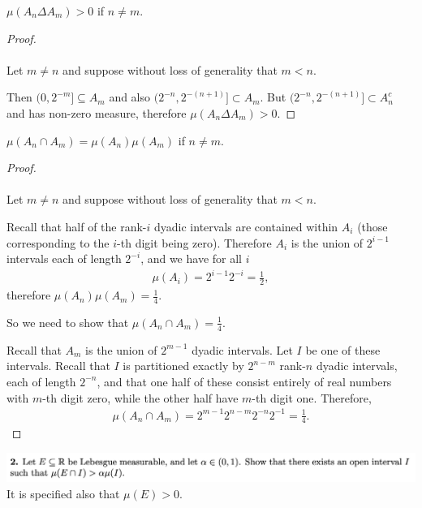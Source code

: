 \begin{claim*}
  $\mu(A_n \Delta A_m) > 0$ if $n \neq m$.
\end{claim*}

\begin{proof}~\\~\\
  Let $m \neq n$ and suppose without loss of generality that $m < n$.

  Then $(0, 2^{-m}] \subseteq A_m$ and also $(2^{-n}, 2^{-(n+1)}] \subset A_m$.
  But $(2^{-n}, 2^{-(n+1)}] \subset A_n^c$ and has non-zero measure, therefore $\mu(A_n \Delta A_m) > 0$.
\end{proof}

\begin{claim*}
  $\mu(A_n \cap A_m) = \mu(A_n)\mu(A_m)$ if $n \neq m$.
\end{claim*}

\begin{proof}~\\~\\
  Let $m \neq n$ and suppose without loss of generality that $m < n$.

  Recall that half of the rank-$i$ dyadic intervals are contained within $A_i$ (those corresponding to
  the $i$-th digit being zero). Therefore $A_i$ is the union of $2^{i-1}$ intervals each of length $2^{-i}$,
  and we have for all $i$
  \begin{align*}
     \mu(A_i) = 2^{i-1}2^{-i} =\frac{1}{2},
  \end{align*}
  therefore $\mu(A_n)\mu(A_m) = \frac{1}{4}$.

  So we need to show that $\mu(A_n \cap A_m) = \frac{1}{4}$.

  Recall that $A_m$ is the union of $2^{m-1}$ dyadic intervals. Let $I$ be one of these intervals. Recall
  that $I$ is partitioned exactly by $2^{n-m}$ rank-$n$ dyadic intervals, each of length $2^{-n}$, and that one
  half of these consist entirely of real numbers with $m$-th digit zero, while the other half have $m$-th digit
  one. Therefore,
  \begin{align*}
    \mu(A_n \cap A_m) = 2^{m-1}2^{n-m}2^{-n}2^{-1} = \frac{1}{4}.
  \end{align*}
\end{proof}
\newpage
\begin{mdframed}
\includegraphics[width=400pt]{img/analysis--berkeley-202a-hw05-2e34.png}\\
It is specified also that $\mu(E) > 0$.
\end{mdframed}

